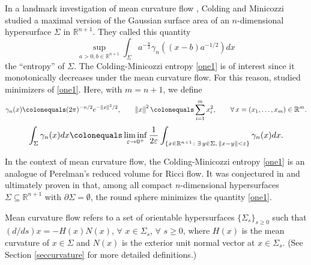 \documentclass[12pt,reqno]{amsart}
\theoremstyle{definition}
\renewcommand{\subset}{\subseteq}
\renewcommand{\epsilon}{\varepsilon}
\newcommand{\vnormt}[1]{\left\|#1\right\|}    %
\newcommand{\R}{\mathbb{R}}
\newcommand{\sdimn}{n}
\newcommand{\adimn}{n+1}
\begin{document}
In a landmark investigation of mean curvature flow \cite{colding12a}, Colding and Minicozzi studied a maximal version of the Gaussian surface area of an $\sdimn$-dimensional hypersurface $\Sigma$ in $\R^{\adimn}$.  They called this quantity
\begin{equation}\label{one1}
\sup_{a>0,b\in\R^{\adimn}}\int_{\Sigma}a^{-\frac{\sdimn}{2}}\gamma_{\sdimn}((x-b)a^{-1/2})dx
\end{equation}
the ``entropy'' of $\Sigma$.  The Colding-Minicozzi entropy \eqref{one1} is of interest since it monotonically decreases under the mean curvature flow.  For this reason, \cite{colding12a} studied minimizers of \eqref{one1}.  Here, with $m=n+1$, we define
$$\gamma_{\sdimn}(x)\colonequals (2\pi)^{-\sdimn/2}e^{-\vnormt{x}^{2}/2},\qquad
\vnormt{x}^{2}\colonequals\sum_{i=1}^{m}x_{i}^{2},\qquad
\forall\,x=(x_{1},\ldots,x_{m})\in\R^{m}.
$$
$$\int_{\Sigma}\gamma_{\sdimn}(x)dx\colonequals\liminf_{\epsilon\to0^{+}}
\frac{1}{2\epsilon}\int_{\{x\in\R^{\adimn}\colon\exists\,y\in\Sigma,\,\vnormt{x-y}<\epsilon\}}\gamma_{\sdimn}(x)dx.$$

In the context of mean curvature flow, the Colding-Minicozzi entropy \eqref{one1} is an analogue of Perelman's reduced volume for Ricci flow.  It was conjectured in \cite{colding12} and ultimately proven in \cite{zhu16} that, among all compact $\sdimn$-dimensional hypersurfaces $\Sigma\subset\R^{\adimn}$ with $\partial\Sigma=\emptyset$, the round sphere minimizes the quantity \eqref{one1}.

Mean curvature flow refers to a set of orientable hypersurfaces $\{\Sigma_{s}\}_{s\geq0}$ such that $(d/ds)x=-H(x)N(x)$, $\forall$ $x\in\Sigma_{s}$, $\forall$ $s\geq0$, where $H(x)$ is the mean curvature of $x\in\Sigma$ and $N(x)$ is the exterior unit normal vector at $x\in\Sigma_{s}$.  (See Section \ref{seccurvature} for more detailed definitions.)

\end{document}
